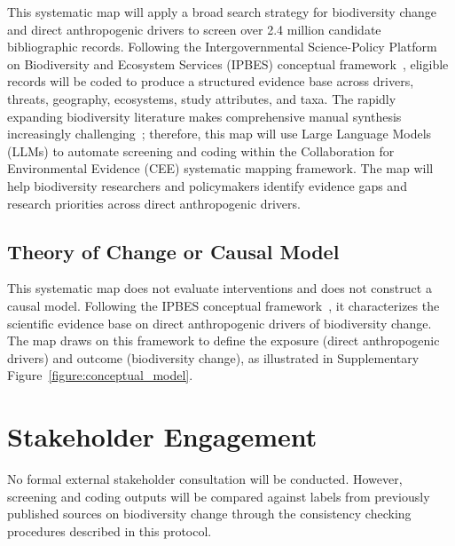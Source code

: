 \documentclass[12pt]{article}
\begin{document}
This systematic map will apply a broad search strategy for biodiversity change and direct anthropogenic drivers to screen over 2.4 million candidate bibliographic records. Following the Intergovernmental Science-Policy Platform on Biodiversity and Ecosystem Services (IPBES) conceptual framework~\cite{diaz_ipbes_2015}, eligible records will be coded to produce a structured evidence base across drivers, threats, geography, ecosystems, study attributes, and taxa. The rapidly expanding biodiversity literature makes comprehensive manual synthesis increasingly challenging~\cite{nunez-mir_automated_2016}; therefore, this map will use Large Language Models (LLMs) to automate screening and coding within the Collaboration for Environmental Evidence (CEE) systematic mapping framework. The map will help biodiversity researchers and policymakers identify evidence gaps and research priorities across direct anthropogenic drivers.


\subsection*{Theory of Change or Causal Model}
This systematic map does not evaluate interventions and does not construct a causal model. Following the IPBES conceptual framework~\cite{diaz_ipbes_2015}, it characterizes the scientific evidence base on direct anthropogenic drivers of biodiversity change. The map draws on this framework to define the exposure (direct anthropogenic drivers) and outcome (biodiversity change), as illustrated in Supplementary Figure~\ref{figure:conceptual_model}.

\section*{Stakeholder Engagement}
No formal external stakeholder consultation will be conducted. However, screening and coding outputs will be compared against labels from previously published sources on biodiversity change through the consistency checking procedures described in this protocol.
\end{document}
